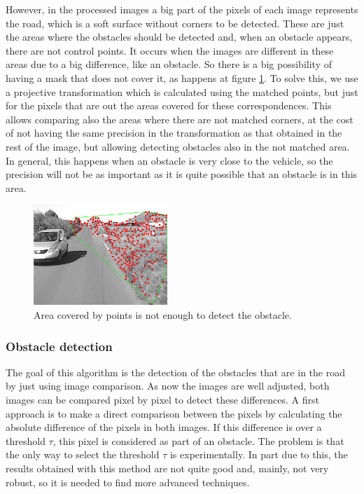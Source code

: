 However, in the processed images a big part of the pixels of each image represents the road, which is a soft surface without corners to be detected. These are just the areas where the obstacles should be detected and, when an obstacle appears, there are not control points. It occurs when the images are different in these areas due to a big difference, like an obstacle. So there is a big possibility of having a mask that does not cover it, as happens at figure \ref{fig:cp02_mask_not_covers}. To solve this, we use a projective transformation which is calculated using the matched points, but just for the pixels that are out the areas covered for these correspondences. This allows comparing also the areas where there are not matched corners, at the cost of not having the same precision in the transformation as that obtained in the rest of the image, but allowing detecting obstacles also in the not matched area. In general, this happens when an obstacle is very close to the vehicle, so the precision will not be as important as it is quite possible that an obstacle is in this area.

\begin{figure}[h!]
\centering
\includegraphics[width=0.45\textwidth]{maskNotCovers}
\caption{Area covered by points is not enough to detect the obstacle.}\label{fig:cp02_mask_not_covers}
\end{figure}

\subsubsection{Obstacle detection}\label{ch:chapter02_01_03_02}

The goal of this algorithm is the detection of the obstacles that are in the road by just using image comparison. As now the images are well adjusted, both images can be compared pixel by pixel to detect these differences. A first approach is to make a direct comparison between the pixels by calculating the absolute difference of the pixels in both images. If this difference is over a threshold $\tau$, this pixel is considered as part of an obstacle. The problem is that the only way to select the threshold $\tau$ is experimentally. In part due to this, the results obtained with this method are not quite good and, mainly, not very robust, so it is needed to find more advanced techniques.

